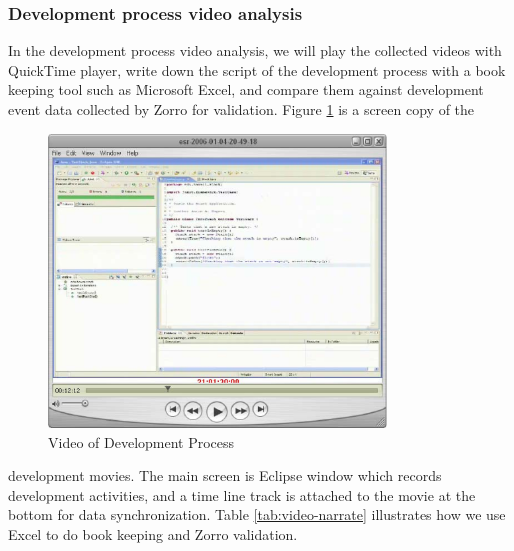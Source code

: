 \subsubsection{Development process video analysis}
In the development process video analysis, we will play the collected
videos with QuickTime player, write down the script of the development
process with a book keeping tool such as Microsoft Excel, and compare them
against development event data collected by Zorro for validation. Figure
\ref{fig:esr-video} is a screen copy of the
\begin{figure}[htbp]
  \centering
  \includegraphics[width=0.8\textwidth]{figs/esr-video.eps}
  \caption{Video of Development Process}\label{fig:esr-video}
\end{figure} 
development movies. The main screen is Eclipse window which records
development activities, and a time line track is attached to the movie at
the bottom for data synchronization. Table \ref{tab:video-narrate}
illustrates how we use Excel to do book keeping and Zorro validation.
